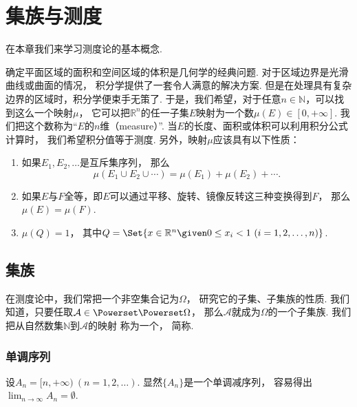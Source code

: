 \chapter{集族与测度}
在本章我们来学习测度论的基本概念.

确定平面区域的面积和空间区域的体积是几何学的经典问题.
对于区域边界是光滑曲线或曲面的情况，
积分学提供了一套令人满意的解决方案.
但是在处理具有复杂边界的区域时，积分学便束手无策了.
于是，我们希望，对于任意\(n\in\mathbb{N}\)，可以找到这么一个映射\(\mu\)，
它可以把\(\mathbb{R}^n\)的任一子集\(E\)映射为一个数\(\mu(E) \in [0,+\infty]\).
我们把这个数称为“\(E\)的\(n\)维（measure）”.
当\(E\)的长度、面积或体积可以利用积分公式计算时，
我们希望积分值等于测度.
另外，映射\(\mu\)应该具有以下性质：\begin{enumerate}
	\item 如果\(E_1,E_2,\dotsc\)是互斥集序列，
	那么\begin{equation*}
		\mu(E_1 \cup E_2 \cup \dotsb)
		= \mu(E_1) + \mu(E_2) + \dotsb.
	\end{equation*}

	\item 如果\(E\)与\(F\)全等，即\(E\)可以通过平移、旋转、镜像反转这三种变换得到\(F\)，
	那么\(\mu(E) = \mu(F)\).

	\item \(\mu(Q)=1\)，
	其中\(Q = \Set{ x\in\mathbb{R}^n \given 0\leq x_i<1\ (i=1,2,\dotsc,n) }\).
\end{enumerate}

\section{集族}
在测度论中，我们常把一个非空集合记为\(\Omega\)，
研究它的子集、子集族的性质.
我们知道，只要任取\(\mathcal{A} \in \Powerset\Powerset\Omega\)，
那么\(\mathcal{A}\)就成为\(\Omega\)的一个子集族.
我们把从自然数集\(\mathbb{N}\)到\(\mathcal{A}\)的映射
称为一个，
简称.

\subsection{单调序列}
\begin{example}
设\(A_n = [n,+\infty)\ (n=1,2,\dotsc)\).
显然\(\{A_n\}\)是一个单调减序列，
容易得出\(\lim_{n\to\infty} A_n = \emptyset\).
\end{example}

